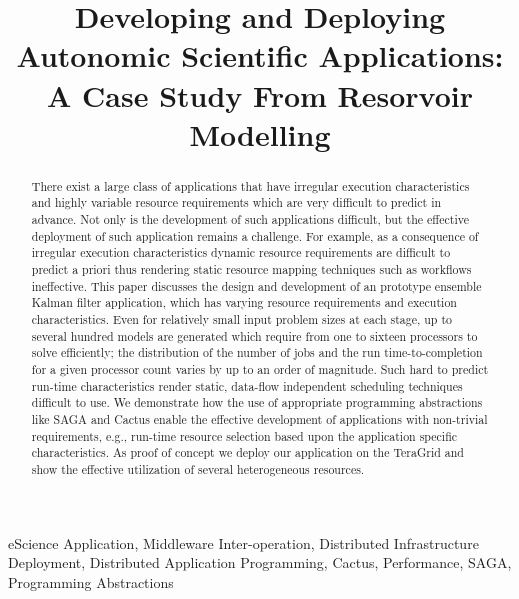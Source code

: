 \documentclass[conference,final]{IEEEtran}
\begin{document}
\title{\large Developing and Deploying Autonomic Scientific
  Applications: A Case Study From Resorvoir Modelling}
  
\author{  
}
\maketitle

 \begin{abstract}
   There exist a large class of applications that have irregular
   execution characteristics and highly variable resource requirements
   which are very difficult to predict in advance.  Not only is the
   development of such applications difficult, but the effective
   deployment of such application remains a challenge.  For example,
   as a consequence of irregular execution characteristics dynamic
   resource requirements are difficult to predict a priori thus
   rendering static resource mapping techniques such as workflows
   ineffective.  This paper discusses the design and development of an
   prototype ensemble Kalman filter application, which has varying
   resource requirements and execution characteristics. Even for
   relatively small input problem sizes at each stage, up to several
   hundred models are generated which require from one to sixteen
   processors to solve efficiently; the distribution of the number of
   jobs and the run time-to-completion for a given processor count
   varies by up to an order of magnitude.  Such hard to predict
   run-time characteristics render static, data-flow independent
   scheduling techniques difficult to use. We demonstrate how the use
   of appropriate programming abstractions like SAGA and Cactus enable
   the effective development of applications with non-trivial
   requirements, e.g., run-time resource selection based upon the
   application specific characteristics.  As proof of concept we
   deploy our application on the TeraGrid and show the effective
   utilization of several heterogeneous resources.
 \end{abstract}
 \begin{keywords}
   eScience Application, Middleware Inter-operation, Distributed
   Infrastructure Deployment, Distributed Application Programming,
   Cactus, Performance, SAGA, Programming Abstractions
 \end{keywords}
\end{document}
